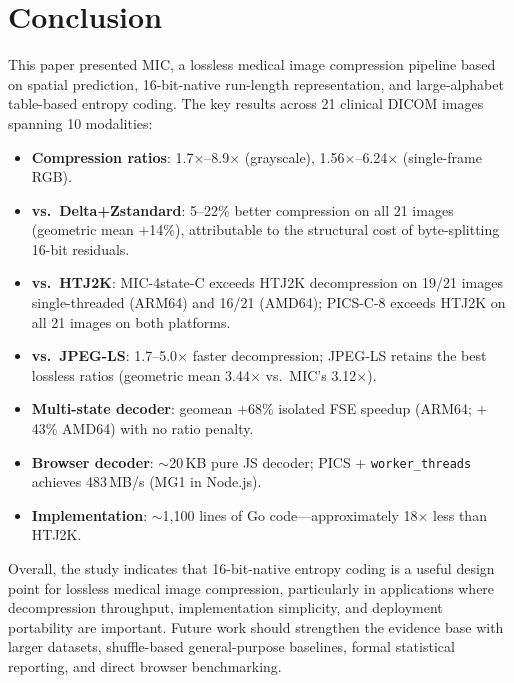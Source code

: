 \documentclass[journal]{IEEEtran}
\begin{document}
\section{Conclusion}
\label{sec:conclusion}

This paper presented MIC, a lossless medical image compression pipeline based on
spatial prediction, 16-bit-native run-length representation, and large-alphabet
table-based entropy coding. The key results across 21 clinical DICOM images
spanning 10 modalities:

\begin{itemize}
  \item \textbf{Compression ratios}: 1.7$\times$--8.9$\times$ (grayscale),
  1.56$\times$--6.24$\times$ (single-frame RGB).

  \item \textbf{vs.\ Delta+Zstandard}: 5--22\% better compression on all 21
  images (geometric mean $+$14\%), attributable to the structural cost of
  byte-splitting 16-bit residuals.

  \item \textbf{vs.\ HTJ2K}: MIC-4state-C exceeds HTJ2K decompression on 19/21
  images single-threaded (ARM64) and 16/21 (AMD64); PICS-C-8 exceeds HTJ2K on
  all 21 images on both platforms.

  \item \textbf{vs.\ JPEG-LS}: 1.7--5.0$\times$ faster decompression; JPEG-LS
  retains the best lossless ratios (geometric mean 3.44$\times$ vs.\ MIC's
  3.12$\times$).

  \item \textbf{Multi-state decoder}: geomean $+$68\% isolated FSE speedup
  (ARM64; $+$43\% AMD64) with no ratio penalty.

  \item \textbf{Browser decoder}: ${\sim}$20\,KB pure JS decoder; PICS +
  \texttt{worker\_threads} achieves 483\,MB/s (MG1 in Node.js).

  \item \textbf{Implementation}: ${\sim}$1,100 lines of Go
  code---approximately 18$\times$ less than HTJ2K.
\end{itemize}

Overall, the study indicates that 16-bit-native entropy coding is a useful
design point for lossless medical image compression, particularly in
applications where decompression throughput, implementation simplicity, and
deployment portability are important. Future work should strengthen the evidence
base with larger datasets, shuffle-based general-purpose baselines, formal
statistical reporting, and direct browser benchmarking.
\end{document}
